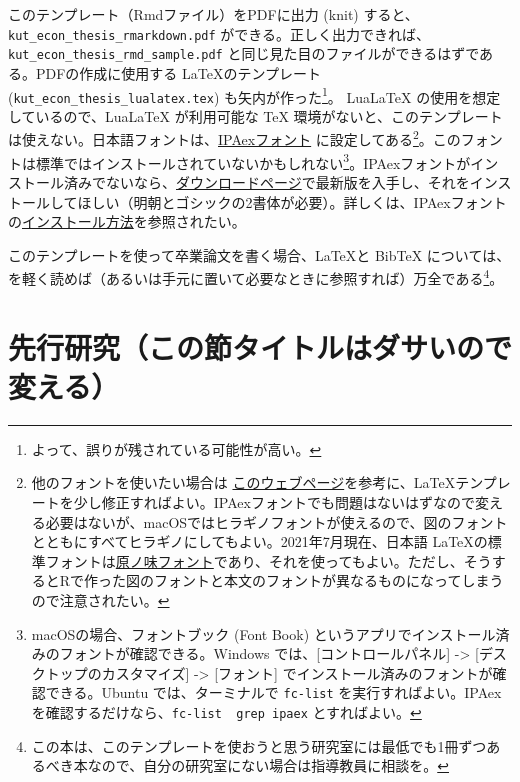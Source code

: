 \documentclass[10.5pt,a4paper,lualatex,ja=standard]{bxjsarticle}
\begin{document}
このテンプレート（Rmdファイル）をPDFに出力 (knit) すると、\texttt{kut\_econ\_thesis\_rmarkdown.pdf} ができる。正しく出力できれば、\texttt{kut\_econ\_thesis\_rmd\_sample.pdf} と同じ見た目のファイルができるはずである。PDFの作成に使用する \LaTeX  のテンプレート (\texttt{kut\_econ\_thesis\_lualatex.tex}) も矢内が作った\footnote{よって、誤りが残されている可能性が高い。}。 LuaLaTeX の使用を想定しているので、LuaLaTeX が利用可能な TeX 環境がないと、このテンプレートは使えない。日本語フォントは、\href{https://moji.or.jp/ipafont/}{IPAexフォント} に設定してある\footnote{他のフォントを使いたい場合は \href{https://ja.osdn.net/projects/luatex-ja/wiki/LuaTeX-ja\%E3\%81\%AE\%E4\%BD\%BF\%E3\%81\%84\%E6\%96\%B9}{このウェブページ}を参考に、\LaTeX テンプレートを少し修正すればよい。IPAexフォントでも問題はないはずなので変える必要はないが、macOSではヒラギノフォントが使えるので、図のフォントとともにすべてヒラギノにしてもよい。2021年7月現在、日本語 \LaTeX  の標準フォントは\href{https://texwiki.texjp.org/?\%E5\%8E\%9F\%E3\%83\%8E\%E5\%91\%B3\%E3\%83\%95\%E3\%82\%A9\%E3\%83\%B3\%E3\%83\%88}{原ノ味フォント}であり、それを使ってもよい。ただし、そうするとRで作った図のフォントと本文のフォントが異なるものになってしまうので注意されたい。}。このフォントは標準ではインストールされていないかもしれない\footnote{macOSの場合、フォントブック (Font Book) というアプリでインストール済みのフォントが確認できる。Windows では、{[}コントロールパネル{]} -\textgreater{} {[}デスクトップのカスタマイズ{]} -\textgreater{} {[}フォント{]} でインストール済みのフォントが確認できる。Ubuntu では、ターミナルで \texttt{fc-list} を実行すればよい。IPAex を確認するだけなら、\texttt{fc-list\ \textbar{}\ grep\ ipaex} とすればよい。}。IPAexフォントがインストール済みでないなら、\href{https://moji.or.jp/ipafont/ipafontdownload/}{ダウンロードページ}で最新版を入手し、それをインストールしてほしい（明朝とゴシックの2書体が必要）。詳しくは、IPAexフォントの\href{https://moji.or.jp/ipafont/installation/}{インストール方法}を参照されたい。

このテンプレートを使って卒業論文を書く場合、\LaTeX  と BibTeX については、\citet{okumura2020} を軽く読めば（あるいは手元に置いて必要なときに参照すれば）万全である\footnote{この本は、このテンプレートを使おうと思う研究室には最低でも1冊ずつあるべき本なので、自分の研究室にない場合は指導教員に相談を。}。

\section{先行研究（この節タイトルはダサいので変える）}\label{ux5148ux884cux7814ux7a76ux3053ux306eux7bc0ux30bfux30a4ux30c8ux30ebux306fux30c0ux30b5ux3044ux306eux3067ux5909ux3048ux308b}
\end{document}
